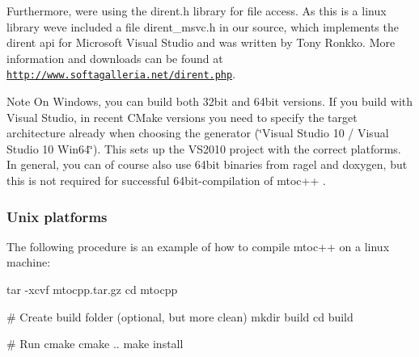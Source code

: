 Furthermore, we\textquotesingle{}re using the {\ttfamily dirent.\+h} library for file access. As this is a linux library we\textquotesingle{}ve included a file {\ttfamily dirent\+\_\+msvc.\+h} in our source, which implements the dirent api for Microsoft Visual Studio and was written by Tony Ronkko. More information and downloads can be found at \href{http://www.softagalleria.net/dirent.php}{\tt http\+://www.\+softagalleria.\+net/dirent.\+php}.

\begin{DoxyNote}{Note}
On Windows, you can build both 32bit and 64bit versions. If you build with Visual Studio, in recent C\+Make versions you need to specify the target architecture already when choosing the generator (\char`\"{}\+Visual Studio 10 / Visual Studio 10 Win64\char`\"{}). This sets up the V\+S2010 project with the correct platforms. In general, you can of course also use 64bit binaries from ragel and doxygen, but this is not required for successful 64bit-\/compilation of mtoc++ .
\end{DoxyNote}
\hypertarget{install_inst_comp_unix}{}\subsubsection{Unix platforms}\label{install_inst_comp_unix}
The following procedure is an example of how to compile mtoc++ on a linux machine\+: 
\begin{DoxyCode}
 tar -xcvf mtocpp.tar.gz
cd mtocpp

\textcolor{preprocessor}{# Create build folder (optional, but more clean)}
mkdir build
cd build

\textcolor{preprocessor}{# Run cmake}
cmake ..
make install
\end{DoxyCode}


